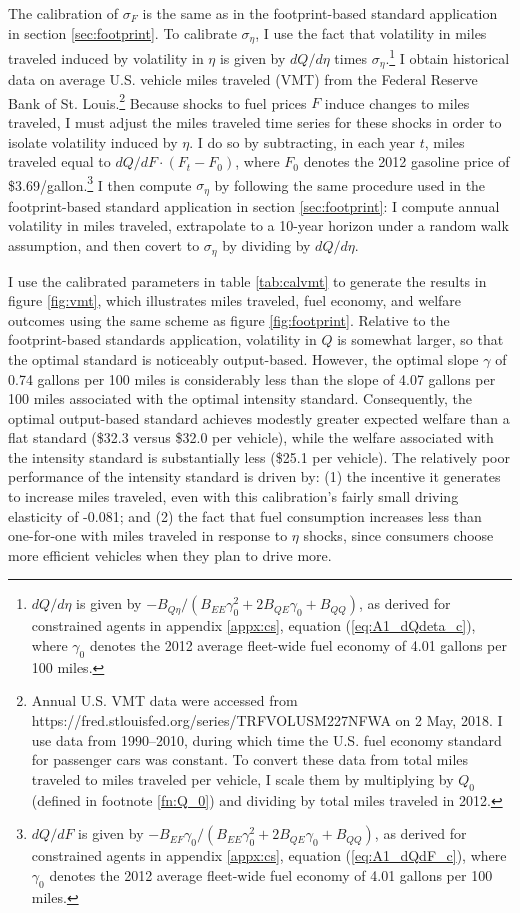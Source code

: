 \documentclass[12pt]{article}
\begin{document}
The calibration of $\sigma_F$ is the same as in the footprint-based standard application in section \ref{sec:footprint}. To calibrate $\sigma_\eta$, I use the fact that volatility in miles traveled induced by volatility in $\eta$ is given by $dQ/d\eta$ times $\sigma_\eta$.\footnote{$dQ/d\eta$ is given by $-B_{Q\eta}/(B_{EE}\gamma_0^2+2B_{QE}\gamma_0+B_{QQ})$, as derived for constrained agents in appendix \ref{appx:cs}, equation (\ref{eq:A1_dQdeta_c}), where $\gamma_0$ denotes the 2012 average fleet-wide fuel economy of 4.01 gallons per 100 miles.} I obtain historical data on average U.S. vehicle miles traveled (VMT) from the Federal Reserve Bank of St. Louis.\footnote{Annual U.S. VMT data were accessed from https://fred.stlouisfed.org/series/TRFVOLUSM227NFWA on 2 May, 2018. I use data from 1990--2010, during which time the U.S. fuel economy standard for passenger cars was constant. To convert these data from total miles traveled to miles traveled per vehicle, I scale them by multiplying by $Q_0$ (defined in footnote \ref{fn:Q_0}) and dividing by total miles traveled in 2012.} Because shocks to fuel prices $F$ induce changes to miles traveled, I must adjust the miles traveled time series for these shocks in order to isolate volatility induced by $\eta$. I do so by subtracting, in each year $t$, miles traveled equal to $dQ/dF\cdot(F_t-F_0)$, where $F_0$ denotes the 2012 gasoline price of \$3.69/gallon.\footnote{$dQ/dF$ is given by $-B_{EF}\gamma_0/(B_{EE}\gamma_0^2+2B_{QE}\gamma_0+B_{QQ})$, as derived for constrained agents in appendix \ref{appx:cs}, equation (\ref{eq:A1_dQdF_c}), where $\gamma_0$ denotes the 2012 average fleet-wide fuel economy of 4.01 gallons per 100 miles.} I then compute $\sigma_\eta$ by following the same procedure used in the footprint-based standard application in section \ref{sec:footprint}: I compute annual volatility in miles traveled, extrapolate to a 10-year horizon under a random walk assumption, and then covert to $\sigma_\eta$ by dividing by $dQ/d\eta$. 

I use the calibrated parameters in table \ref{tab:calvmt} to generate the results in figure \ref{fig:vmt}, which illustrates miles traveled, fuel economy, and welfare outcomes using the same scheme as figure \ref{fig:footprint}. Relative to the footprint-based standards application, volatility in $Q$ is somewhat larger, so that the optimal standard is noticeably output-based. However, the optimal slope $\gamma$ of 0.74 gallons per 100 miles is considerably less than the slope of 4.07 gallons per 100 miles associated with the optimal intensity standard. Consequently, the optimal output-based standard achieves modestly greater expected welfare than a flat standard (\$32.3 versus \$32.0 per vehicle), while the welfare associated with the intensity standard is substantially less (\$25.1 per vehicle). The relatively poor performance of the intensity standard is driven by: (1) the incentive it generates to increase miles traveled, even with this calibration's fairly small driving elasticity of -0.081; and (2) the fact that fuel consumption increases less than one-for-one with miles traveled in response to $\eta$ shocks, since consumers choose more efficient vehicles when they plan to drive more.
\end{document}
